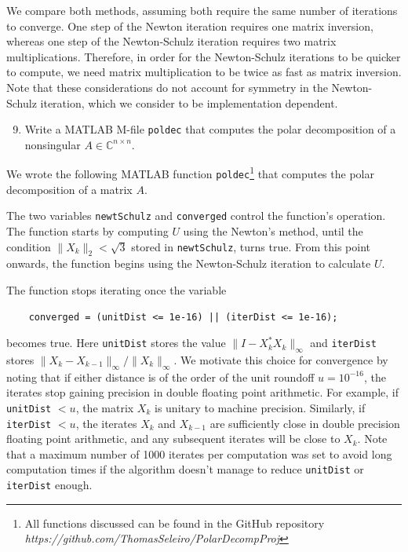 \documentclass[10pt, A4paper]{article}
\newcommand{\nxn}{n \times n}
\begin{document}
We compare both methods, assuming both require the same number of 
iterations to converge. 
One step of the Newton iteration requires one matrix inversion, whereas 
one step of the Newton-Schulz iteration requires two matrix 
multiplications.
Therefore, in order for the Newton-Schulz iterations to be quicker to 
compute, we need matrix multiplication to be twice as fast as matrix 
inversion.
Note that these considerations do not account for symmetry in the 
Newton-Schulz iteration, which we consider to be implementation 
dependent. 





\vspace{0.2cm}
\begin{enumerate}
	\setcounter{enumi}{8}
	\item Write a MATLAB M-file \texttt{poldec} that computes the 
	polar decomposition of a nonsingular $A \in \mathbb{C}^{\nxn}$.
\end{enumerate}

We wrote the following MATLAB function \texttt{poldec}\footnote{
All functions discussed can be found in the GitHub repository
\emph{https://github.com/ThomasSeleiro/PolarDecompProj}}
that computes the polar decomposition of a matrix $A$.

{\small
{}
}

The two variables \texttt{newtSchulz} and \texttt{converged} control 
the function's operation.
The function starts by computing $U$ using the Newton's method, until
the condition $\|X_k\|_2 < \sqrt{3}$ stored in \texttt{newtSchulz},
turns true. 
From this point onwards, the function begins using the {Newton-Schulz} 
iteration to calculate $U$.

The function stops iterating once the variable
\begin{verbatim}
	converged = (unitDist <= 1e-16) || (iterDist <= 1e-16);
\end{verbatim}
becomes true.
Here \texttt{unitDist} stores the value $\|I -X_k^*X_k\|_\infty$ and 
\texttt{iterDist} stores $\|X_k - X_{k-1} \|_\infty / \|X_k\|_\infty$.
We motivate this choice for convergence by noting that if either 
distance is of the order of the unit roundoff $u = 10^{-16}$, the 
iterates stop gaining precision in double floating point arithmetic.
For example, if \texttt{unitDist} $< u$, the matrix $X_k$ is unitary to 
machine precision. Similarly, if \texttt{iterDist} $< u$, the iterates 
$X_k$ and $X_{k-1}$ are sufficiently close in double precision floating 
point arithmetic, and any subsequent iterates will be close to $X_k$.
Note that a maximum number of 1000 iterates per computation was set to 
avoid long computation times if the algorithm doesn't manage to reduce 
\texttt{unitDist} or \texttt{iterDist} enough.
\end{document}
